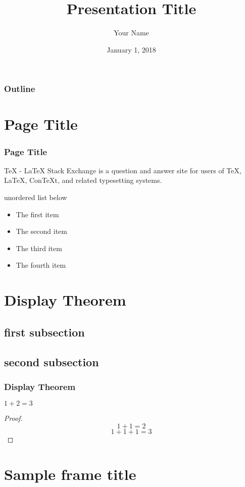 \documentclass{beamer}
\author{Your Name}
\title{Presentation Title}
\date{January 1, 2018}
\begin{document}
\frame[plain]{\titlepage}

\begin{frame}
\frametitle{Outline}
\tableofcontents
\end{frame}

\section{Page Title}

\begin{frame}
\frametitle{Page Title}

TeX - LaTeX Stack Exchange is a question and answer site for users of TeX, LaTeX, ConTeXt, and related typesetting systems.

\vspace{0.4cm}

unordered list below

\begin{itemize}
\item The first item
\item The second item
\item The third item
\item The fourth item
\end{itemize}

\end{frame}

\section{Display Theorem}

\subsection{first subsection}

\subsection{second subsection}



\begin{frame}
  \frametitle{Display Theorem}
  \begin{theorem}
    $1 + 2 = 3$
  \end{theorem}
  \begin{proof}
    $$1 + 1 = 2$$
    $$1 + 1 + 1 = 3$$
  \end{proof}
\end{frame}

\section{Sample frame title}
\end{document}
